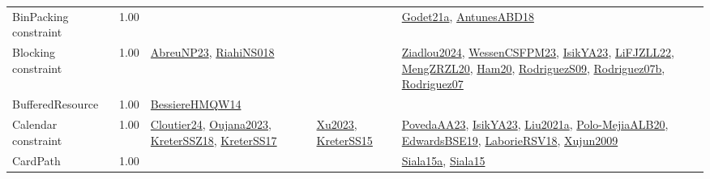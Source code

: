 {\begin{longtable}{p{3cm}r>{\raggedright\arraybackslash}p{6cm}>{\raggedright\arraybackslash}p{6cm}>{\raggedright\arraybackslash}p{8cm}}
\index{BinPacking constraint}\index{Constraints!BinPacking constraint}BinPacking constraint &  1.00 &  &  & \hyperref[detail:Godet21a]{Godet21a}, \hyperref[detail:AntunesABD18]{AntunesABD18}\\
\index{Blocking constraint}\index{Constraints!Blocking constraint}Blocking constraint &  1.00 & \hyperref[detail:AbreuNP23]{AbreuNP23}, \hyperref[detail:RiahiNS018]{RiahiNS018} &  & \hyperref[detail:Ziadlou2024]{Ziadlou2024}, \hyperref[detail:WessenCSFPM23]{WessenCSFPM23}, \hyperref[detail:IsikYA23]{IsikYA23}, \hyperref[detail:LiFJZLL22]{LiFJZLL22}, \hyperref[detail:MengZRZL20]{MengZRZL20}, \hyperref[detail:Ham20]{Ham20}, \hyperref[detail:RodriguezS09]{RodriguezS09}, \hyperref[detail:Rodriguez07b]{Rodriguez07b}, \hyperref[detail:Rodriguez07]{Rodriguez07}\\
\index{BufferedResource}\index{Constraints!BufferedResource}BufferedResource &  1.00 & \hyperref[detail:BessiereHMQW14]{BessiereHMQW14} &  & \\
\index{Calendar constraint}\index{Constraints!Calendar constraint}Calendar constraint &  1.00 & \hyperref[detail:Cloutier24]{Cloutier24}, \hyperref[detail:Oujana2023]{Oujana2023}, \hyperref[detail:KreterSSZ18]{KreterSSZ18}, \hyperref[detail:KreterSS17]{KreterSS17} & \hyperref[detail:Xu2023]{Xu2023}, \hyperref[detail:KreterSS15]{KreterSS15} & \hyperref[detail:PovedaAA23]{PovedaAA23}, \hyperref[detail:IsikYA23]{IsikYA23}, \hyperref[detail:Liu2021a]{Liu2021a}, \hyperref[detail:Polo-MejiaALB20]{Polo-MejiaALB20}, \hyperref[detail:EdwardsBSE19]{EdwardsBSE19}, \hyperref[detail:LaborieRSV18]{LaborieRSV18}, \hyperref[detail:Xujun2009]{Xujun2009}\\
\index{CardPath}\index{Constraints!CardPath}CardPath &  1.00 &  &  & \hyperref[detail:Siala15a]{Siala15a}, \hyperref[detail:Siala15]{Siala15}\\

\end{longtable}}
